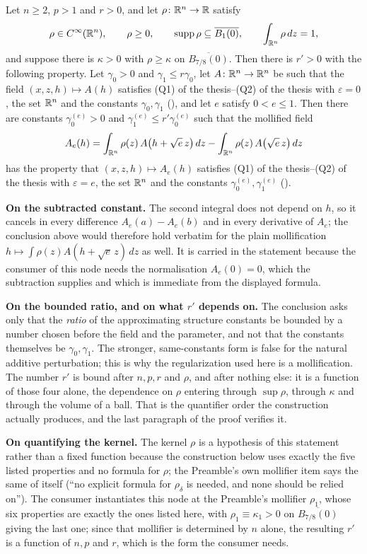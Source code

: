 \begin{helper}
Let $n\ge2$, $p>1$ and $r>0$, and let $\rho\colon\mathbb{R}^n\to\mathbb{R}$ satisfy
\[
\rho\in C^\infty(\mathbb{R}^n),
\qquad
\rho\ge0,
\qquad
\operatorname{supp}\rho\subseteq\overline{B_1(0)},
\qquad
\int_{\mathbb{R}^n}\rho\,dz=1 ,
\]
and suppose there is $\kappa>0$ with $\rho\ge\kappa$ on $\overline{B_{7/8}(0)}$.
Then there is $r'>0$ with the following property.  Let $\gamma_0>0$ and
$\gamma_1\le r\gamma_0$, let $A\colon\mathbb{R}^n\to\mathbb{R}^n$ be such that the field
$(x,z,h)\mapsto A(h)$ satisfies (Q1) of the thesis--(Q2) of the thesis with
$\varepsilon=0$, the set $\mathbb{R}^n$ and the constants $\gamma_0,\gamma_1$
(), and let $e$ satisfy $0<e\le1$.  Then there are
constants $\gamma_0^{(e)}>0$ and $\gamma_1^{(e)}\le r'\gamma_0^{(e)}$ such that
the mollified field
\[
A_e(h)=\int_{\mathbb{R}^n}\rho(z)\,A\bigl(h+\sqrt e\,z\bigr)\,dz
-\int_{\mathbb{R}^n}\rho(z)\,A\bigl(\sqrt e\,z\bigr)\,dz
\]
has the property that $(x,z,h)\mapsto A_e(h)$ satisfies
(Q1) of the thesis--(Q2) of the thesis with $\varepsilon=e$, the set $\mathbb{R}^n$ and the
constants $\gamma_0^{(e)},\gamma_1^{(e)}$ ().

\textbf{On the subtracted constant.}  The second integral does not depend on
$h$, so it cancels in every difference $A_e(a)-A_e(b)$ and in every derivative
of $A_e$; the conclusion above would therefore hold verbatim for the plain
mollification $h\mapsto\int\rho(z)A(h+\sqrt e\,z)\,dz$ as well.  It is carried
in the statement because the consumer of this node needs the normalisation
$A_e(0)=0$, which the subtraction supplies and which is immediate from the
displayed formula.

\textbf{On the bounded ratio, and on what $r'$ depends on.}  The conclusion
asks only that the \emph{ratio} of the approximating structure constants be
bounded by a number chosen before the field and the parameter, and not that the
constants themselves be $\gamma_0,\gamma_1$.  The stronger, same-constants form
is false for the natural additive perturbation; this is why the regularization
used here is a mollification.  The number $r'$ is bound after $n,p,r$ and
$\rho$, and after nothing else: it is a function of those four alone, the
dependence on $\rho$ entering through $\sup\rho$, through $\kappa$ and through
the volume of a ball.  That is the quantifier order the construction actually
produces, and the last paragraph of the proof verifies it.

\textbf{On quantifying the kernel.}  The kernel $\rho$ is a hypothesis of this
statement rather than a fixed function because the construction below uses
exactly the five listed properties and no formula for $\rho$; the Preamble's own
mollifier item says the same of itself (``no explicit formula for $\rho_\delta$
is needed, and none should be relied on'').  The consumer instantiates this node
at the Preamble's mollifier $\rho_1$, whose six properties are exactly the ones
listed here, with $\rho_1\equiv\kappa_1>0$ on $\overline{B_{7/8}(0)}$ giving the
last one; since that mollifier is determined by $n$ alone, the resulting $r'$ is
a function of $n,p$ and $r$, which is the form the consumer needs.


\end{helper}
